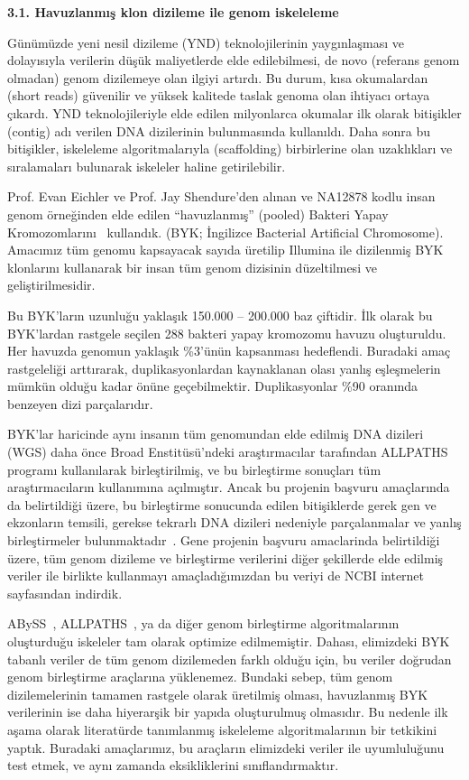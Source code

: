 \documentclass[11pt]{article}
\begin{document}
{\bf \large 3.1. Havuzlanmış klon dizileme ile genom iskeleleme}


Günümüzde yeni nesil dizileme (YND) teknolojilerinin yaygınlaşması ve dolayısıyla verilerin düşük maliyetlerde elde edilebilmesi, de novo (referans genom olmadan) 
genom dizilemeye olan ilgiyi artırdı.
Bu durum, kısa okumalardan (short reads) güvenilir ve yüksek kalitede taslak genoma olan ihtiyacı ortaya çıkardı. YND teknolojileriyle elde edilen milyonlarca okumalar ilk olarak bitişikler (contig) adı verilen DNA dizilerinin bulunmasında kullanıldı. Daha sonra bu bitişikler, iskeleleme algoritmalarıyla (scaffolding) birbirlerine olan uzaklıkları ve sıralamaları bulunarak iskeleler haline getirilebilir.

Prof. Evan Eichler ve Prof. Jay Shendure'den alınan ve NA12878 kodlu insan genom örneğinden elde edilen ``havuzlanmış'' (pooled) Bakteri Yapay Kromozomlarını~\cite{Kitzman2011} kullandık. 
(BYK; İngilizce Bacterial Artificial Chromosome). 
Amacımız tüm genomu kapsayacak sayıda üretilip Illumina ile dizilenmiş BYK klonlarını kullanarak bir insan tüm genom dizisinin düzeltilmesi ve geliştirilmesidir.
	
Bu BYK’ların uzunluğu yaklaşık 150.000 – 200.000 baz çiftidir. İlk olarak bu BYK'lardan rastgele seçilen 288 bakteri yapay kromozomu havuzu oluşturuldu. Her havuzda genomun yaklaşık \%3'ünün 
kapsanması hedeflendi. Buradaki amaç rastgeleliği arttırarak, duplikasyonlardan kaynaklanan olası yanlış eşleşmelerin mümkün olduğu kadar önüne geçebilmektir. 
Duplikasyonlar \%90 oranında benzeyen dizi parçalarıdır. 

BYK’lar haricinde aynı insanın tüm genomundan elde edilmiş DNA dizileri (WGS) daha önce Broad Enstitüsü’ndeki araştırmacılar tarafından ALLPATHS~\cite{Gnerre2011} programı kullanılarak birleştirilmiş, ve bu birleştirme sonuçları tüm araştırmacıların kullanımına açılmıştır. Ancak bu projenin başvuru amaçlarında da belirtildiği üzere, bu birleştirme sonucunda edilen bitişiklerde gerek gen ve ekzonların temsili, gerekse tekrarlı DNA dizileri nedeniyle parçalanmalar ve yanlış birleştirmeler bulunmaktadır~\cite{Alkan2011c}. Gene projenin başvuru amaclarinda belirtildiği üzere, tüm genom dizileme ve birleştirme verilerini diğer şekillerde elde edilmiş veriler ile birlikte kullanmayı amaçladığımızdan bu veriyi de NCBI internet sayfasından indirdik.

ABySS~\cite{Simpson2009}, ALLPATHS~\cite{Simpson2009}, ya da diğer genom birleştirme algoritmalarının oluşturduğu iskeleler tam olarak optimize edilmemiştir. Dahası, elimizdeki BYK tabanlı veriler de tüm genom dizilemeden farklı olduğu için, bu veriler doğrudan genom birleştirme araçlarına yüklenemez. Bundaki sebep, tüm genom dizilemelerinin tamamen rastgele olarak üretilmiş olması, havuzlanmış BYK verilerinin ise daha hiyerarşik bir yapıda oluşturulmuş olmasıdır. Bu nedenle ilk aşama olarak literatürde tanımlanmış iskeleleme algoritmalarının bir tetkikini yaptık. Buradaki amaçlarımız, bu araçların elimizdeki veriler ile uyumluluğunu test etmek, ve aynı zamanda eksikliklerini sınıflandırmaktır.
\end{document}
